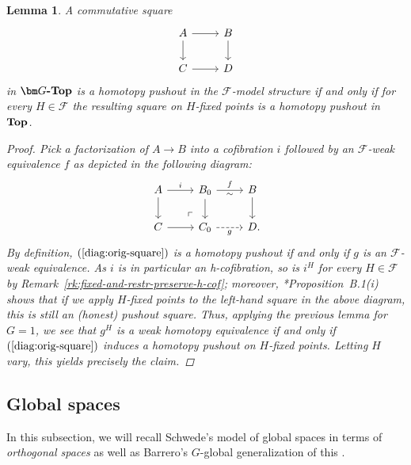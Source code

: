 \documentclass[reqno]{memo-l}
\theoremstyle{mythm}
\newtheorem{lemma}[thm]{Lemma}
\theoremstyle{definition}
\numberwithin{equation}{section}
\newcommand{\Ff}{{\mathcal{F}}}
\newcommand{\cat}[1]{\textbf{\textup{#1}}}
\begin{document}
\begin{lemma}\label{lemma:homotopy-po-equiv-fixed-points}
    A commutative square 
    \begin{equation}\label{diag:orig-square}
        \begin{tikzcd}
            A\arrow[r]\arrow[d] & B\arrow[d]\\
            C\arrow[r] & D
        \end{tikzcd}
    \end{equation}
    in $\cat{$\bm G$-Top}$ is a homotopy pushout in the $\Ff$-model structure if and only if for every $H\in\Ff$ the resulting square on $H$-fixed points is a homotopy pushout in $\cat{Top}$.
    \begin{proof}
        Pick a factorization of $A\to B$ into a cofibration $i$ followed by an $\Ff$-weak equivalence $f$ as depicted in the following diagram:
        \[
            \begin{tikzcd}
                A\arrow[r,"i"]\arrow[d]\arrow[dr,phantom,"\ulcorner"{very near end}] & B_0\arrow[r,"f","\sim"']\arrow[d] & B\arrow[d]\\
                C\arrow[r] & C_0\arrow[r,dashed,"g"'] & D\rlap.
            \end{tikzcd}
        \]
        By definition, $(\ref{diag:orig-square})$ is a homotopy pushout if and only if $g$ is an $\Ff$-weak equivalence. As $i$ is in particular an h-cofibration, so is $i^H$ for every $H\in\Ff$ by Remark~\ref{rk:fixed-and-restr-preserve-h-cof}; moreover, \cite{schwede2018global}*{Proposition~B.1(i)} shows that if we apply $H$-fixed points to the left-hand square in the above diagram, this is still an (honest) pushout square. Thus, applying the previous lemma for $G=1$, we see that $g^H$ is a weak homotopy equivalence if and only if $(\ref{diag:orig-square})$ induces a homotopy pushout on $H$-fixed points. Letting $H$ vary, this yields precisely the claim.
    \end{proof}
\end{lemma}

\subsection{Global spaces} In this subsection, we will recall Schwede's model of global spaces in terms of \emph{orthogonal spaces} \cite{schwede2018global} as well as Barrero's $G$-global generalization of this \cite{barrero2021}. 
\end{document}
